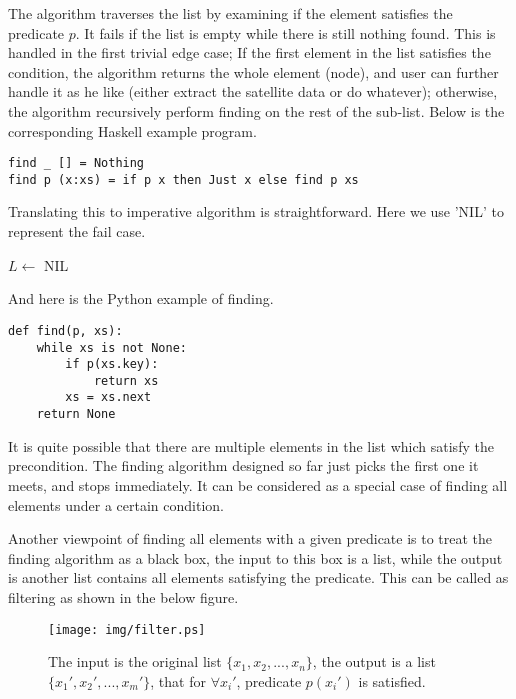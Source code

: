 \documentclass[UTF8]{article}
\begin{document}
The algorithm traverses the list by examining if the element satisfies the predicate $p$. It
fails if the list is empty while there is still nothing found. This is handled in the first
trivial edge case; If the first element in the list satisfies the condition, the algorithm
returns the whole element (node), and user can further handle it as he like (either extract
the satellite data or do whatever); otherwise, the algorithm recursively perform finding
on the rest of the sub-list. Below is the corresponding Haskell example program.

\lstset{language=Haskell}
\begin{lstlisting}
find _ [] = Nothing
find p (x:xs) = if p x then Just x else find p xs
\end{lstlisting}

Translating this to imperative algorithm is straightforward. Here we use 'NIL' to represent
the fail case.

\begin{algorithmic}[1]
      \State \Return {}
    \EndIf
    \State $L \gets$ 
  \EndWhile
  \State \Return NIL
\EndFunction
\end{algorithmic}

And here is the Python example of finding.

\lstset{language=Python}
\begin{lstlisting}
def find(p, xs):
    while xs is not None:
        if p(xs.key):
            return xs
        xs = xs.next
    return None
\end{lstlisting}

It is quite possible that there are multiple elements in the list which satisfy the precondition.
The finding algorithm designed so far just picks the first one it meets, and stops immediately.
It can be considered as a special case of finding all elements under a certain condition.

Another viewpoint of finding all elements with a given predicate is to treat the finding algorithm
as a black box, the input to this box is a list, while the output is another list contains
all elements satisfying the predicate. This can be called as filtering as shown in the below
figure.

\begin{figure}[htbp]
        \centering
        \texttt{[image: img/filter.ps]}
        \caption{The input is the original list $\{x_1, x_2, ..., x_n\}$, the output is a list $\{x_1', x_2', ..., x_m'\}$, that for $\forall x_i'$, predicate $p(x_i')$ is satisfied.} \label{fig:filter}
\end{figure}
\end{document}
